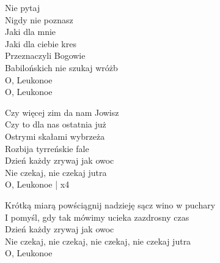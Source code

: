 \begin{text}

    Nie pytaj\\
    Nigdy nie poznasz\\
    Jaki dla mnie\\
    Jaki dla ciebie kres\\
    Przeznaczyli Bogowie\\
    Babilońskich nie szukaj wróżb\\
    O, Leukonoe\\
    O, Leukonoe

    Czy więcej zim da nam Jowisz\\
    Czy to dla nas ostatnia już\\
    Ostrymi skałami wybrzeża\\
    Rozbija tyrreńskie fale\\
    Dzień każdy zrywaj jak owoc\\
    Nie czekaj, nie czekaj jutra\\
    O, Leukonoe | x4

    Krótką miarą powściągnij nadzieję sącz wino w puchary\\
    I pomyśl, gdy tak mówimy ucieka zazdrosny czas\\
    Dzień każdy zrywaj jak owoc\\
    Nie czekaj, nie czekaj, nie czekaj, nie czekaj jutra\\
    O, Leukonoe
    
\end{text}
\begin{chord}

\end{chord}